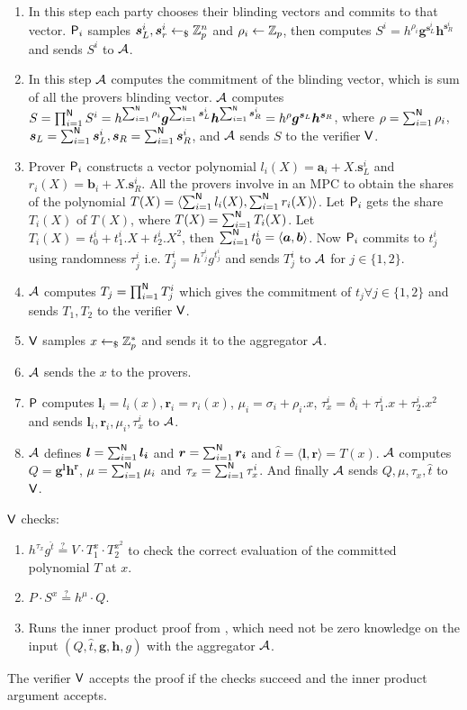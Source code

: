 \begin{enumerate}
	\item In this step each party chooses their blinding vectors and commits to that vector. $\mathsf{P}_i$ samples $\bm{s}^i_L, \bm{s}^i_r \leftarrow_\$ \mathbb{Z}_p^n$ and $\rho_i\leftarrow \mathbb{Z}_p$, then computes $S^i=h^{\rho_i}\bm{g}^{\bm{s}^i_L}\bm{h}^{\bm{s}^i_R}$ and sends $S^i$ to ${\cal A}$.
	\item In this step ${\cal A}$ computes the commitment of the blinding vector, which is sum of all the provers blinding vector. ${\cal A}$ computes $S = \prod_{i=1}^{\mathsf{N}}S^i = h^{\sum_{i=1}^{\mathsf{N}}\rho_i}\bm{g}^{\sum_{i=1}^{\mathsf{N}}\bm{s}_L^i}\bm{h}^{\sum_{i=1}^{\mathsf{N}}\bm{s}^i_R} = h^{\rho}\bm{g}^{\bm{s}_L}\bm{h}^{\bm{s}_R}$, where $\rho = \sum_{i=1}^{\mathsf{N}}\rho_i$, $\bm{s}_L =\sum_{i=1}^{\mathsf{N}} \bm{s}^i_L,  \bm{s}_R=\sum_{i=1}^{\mathsf{N}}\bm{s}^i_R$, and ${\cal A}$ sends $S$ to the verifier $\mathsf{V}$.
	\item Prover $\mathsf{P}_i$ constructs a vector polynomial $l_i(X)=\bm{a}_i + X. \bm{s}^i_L$ and $r_i(X)=\bm{b}_i + X. \bm{s}^i_R$. All the provers involve in an MPC to obtain the shares of the polynomial $T(X)=\langle \sum_{i=1}^{\mathsf{N}} l_i(X),\sum_{i=1}^{\mathsf{N}} r_i(X)\rangle$. Let $\mathsf{P}_i$ gets the share $T_i(X)$ of $T(X)$, where $T(X)=\sum_{i=1}^{\mathsf{N}}T_i(X)$. Let $T_i(X)= t^i_0+t^i_1.X+t^i_2.X^2$, then $\sum_{i=1}^{\mathsf{N}} t^i_0=\langle \bm{a}, \bm{b} \rangle$. Now $\mathsf{P}_i$ commits to $t^i_j$ using randomness $\tau^i_j$ i.e. $T^i_j=h^{\tau^i_j}g^{t^i_j}$ and sends $T^i_j$ to ${\cal A}$ for $j\in \{1,2\}$.
	\item ${\cal A}$ computes $T_j=\prod_{i=1}^{\mathsf{N}} T^i_j$ which gives the commitment of $t_j \forall j\in\{1,2\}$ and sends $T_1,T_2$ to the verifier $\mathsf{V}$.
	\item $\mathsf{V}$ samples $x\leftarrow_\$\mathbb{Z}^*_p$ and sends it to the aggregator ${\cal A}$.
	\item ${\cal A}$ sends the $x$ to the provers. 
	\item $\mathsf{P}$ computes $\bm{l}_i=l_i(x), \bm{r}_i=r_i(x)$, $\mu_i= \sigma_i+\rho_i.x$, $\tau^i_x= \delta_i+\tau^i_1.x+\tau^i_2.x^2$ and sends $\bm{l}_i,\bm{r}_i, \mu_i, \tau^i_x$ to ${\cal A}$.
	\item ${\cal A}$ defines $\bm{l}=\sum_{i=1}^{\mathsf{N}}\bm{l_i}$ and $\bm{r}=\sum_{i=1}^{\mathsf{N}}\bm{r_i}$ and $\hat{t}=\langle \bm{l},\bm{r}\rangle =T(x)$. ${\cal A}$ computes $Q=\bm{g^lh^r}$, $\mu=\sum_{i=1}^{\mathsf{N}} \mu_i$ and $\tau_x = \sum_{i=1}^{\mathsf{N}}\tau_x^i$. And finally ${\cal A}$ sends $Q, \mu, \tau_x, \hat{t}$ to $\mathsf{V}$.
\end{enumerate}
$\mathsf{V}$ checks: 
\begin{enumerate}
	\item $h^{\tau_x}g^{\hat{t}} \stackrel{?}{=} V\cdot T_1^x\cdot T_2^{x^2}$ to check the correct evaluation of the committed polynomial $T$ at $x$.
	\item $P\cdot S^x \stackrel{?}{=} h^{\mu}\cdot Q$. 
	\item Runs the inner product proof from \cite{Bulletproofs}, which need not be zero knowledge on the input $(Q, \hat{t}, \bm{g}, \bm{h}, g)$ with the aggregator ${\cal A}$.
\end{enumerate}
The verifier $\mathsf{V}$ accepts the proof if the checks succeed and the inner product argument accepts.

